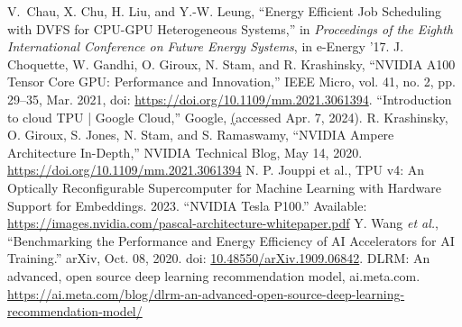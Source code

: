 \begin{thebibliography}{00}
     V. Chau, X. Chu, H. Liu, and Y.-W. Leung,
``Energy Efficient Job Scheduling with DVFS for CPU-GPU Heterogeneous Systems,'' in \textit{Proceedings of the Eighth International Conference on Future Energy Systems},
in e-Energy ’17.
 J. Choquette, W. Gandhi, O. Giroux, N. Stam, and R. Krashinsky, ``NVIDIA A100 Tensor Core GPU: Performance and Innovation,'' IEEE Micro, vol. 41, no. 2, pp. 29–35, Mar. 2021, doi: \href{https://doi.org/10.1109/mm.2021.3061394}{https://doi.org/10.1109/mm.2021.3061394}.
 ``Introduction to cloud TPU  |  Google Cloud,'' Google, \href{https://cloud.google.com/tpu/docs/intro-to-tpu} (accessed Apr. 7, 2024).
 R. Krashinsky, O. Giroux, S. Jones, N. Stam, and S. Ramaswamy, ``NVIDIA Ampere Architecture In-Depth,'' NVIDIA Technical Blog, May 14, 2020. \href{https://developer.nvidia.com/blog/nvidia-ampere-architecture-in-depth/}{https://doi.org/10.1109/mm.2021.3061394}
     N. P. Jouppi et al., TPU v4: An Optically Reconfigurable Supercomputer for Machine Learning with Hardware Support for Embeddings. 2023.
 ``NVIDIA Tesla P100.'' Available: \href{https://images.nvidia.com/content/pdf/tesla/whitepaper/pascal-architecture-whitepaper.pdf}{https://images.nvidia.com/pascal-architecture-whitepaper.pdf}
 Y. Wang \textit{et al.}, “Benchmarking the Performance and Energy Efficiency of AI Accelerators for AI Training.” arXiv, Oct. 08, 2020. doi: \href{https://doi.org/10.48550/arXiv.1909.06842}{10.48550/arXiv.1909.06842}.
 DLRM: An advanced, open source deep learning recommendation model, ai.meta.com. \href{https://ai.meta.com/blog/dlrm-an-advanced-open-source-deep-learning-recommendation-model/}{https://ai.meta.com/blog/dlrm-an-advanced-open-source-deep-learning-recommendation-model/}
\end{thebibliography}